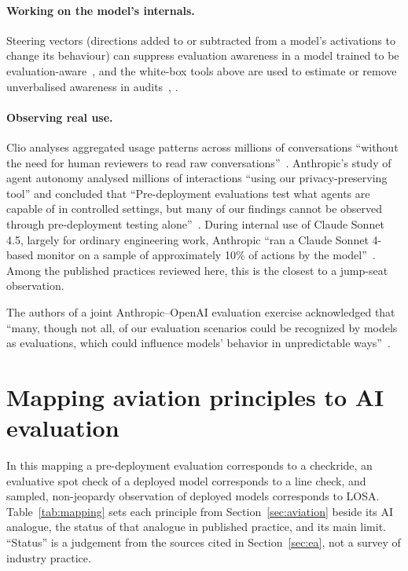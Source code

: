 \documentclass[11pt]{article}
\begin{document}
\paragraph{Working on the model's internals.} Steering vectors (directions added to or subtracted from a model's activations to change its behaviour) can suppress evaluation awareness in a model trained to be evaluation-aware~\cite{hua2025}, and the white-box tools above are used to estimate or remove unverbalised awareness in audits~\cite[Sec.~6.5]{anthropic2026opus46}, \cite{frasertaliente2026,gurnee2026}.

\paragraph{Observing real use.} Clio analyses aggregated usage patterns across millions of conversations ``without the need for human reviewers to read raw conversations''~\cite[abstract]{tamkin2024}. Anthropic's study of agent autonomy analysed millions of interactions ``using our privacy-preserving tool'' and concluded that ``Pre-deployment evaluations test what agents are capable of in controlled settings, but many of our findings cannot be observed through pre-deployment testing alone''~\cite[``Looking ahead'']{mccain2026}. During internal use of Claude Sonnet 4.5, largely for ordinary engineering work, Anthropic ``ran a Claude Sonnet 4-based monitor on a sample of approximately 10\% of actions by the model''~\cite[Sec.~7.4.2]{anthropic2025sonnet45}. Among the published practices reviewed here, this is the closest to a jump-seat observation.

The authors of a joint Anthropic--OpenAI evaluation exercise acknowledged that ``many, though not all, of our evaluation scenarios could be recognized by models as evaluations, which could influence models' behavior in unpredictable ways''~\cite[``Limitations'']{bowman2025}.

\section{Mapping aviation principles to AI evaluation}\label{sec:mapping}

In this mapping a pre-deployment evaluation corresponds to a checkride, an evaluative spot check of a deployed model corresponds to a line check, and sampled, non-jeopardy observation of deployed models corresponds to LOSA. Table~\ref{tab:mapping} sets each principle from Section~\ref{sec:aviation} beside its AI analogue, the status of that analogue in published practice, and its main limit. ``Status'' is a judgement from the sources cited in Section~\ref{sec:ea}, not a survey of industry practice.
\end{document}
